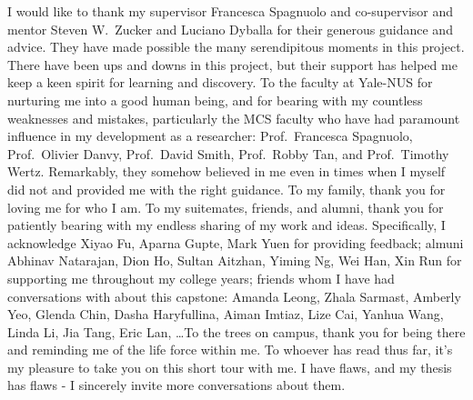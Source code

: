 \documentclass[
hidelinks,
12pt, %
oneside, %
english, %
doublespacing, %
headsepline, %
chapterinoneline, %
]{MastersDoctoralThesis} %
\begin{document}


\begin{acknowledgements}
\addchaptertocentry{\acknowledgementname} 
    I would like to thank my supervisor Francesca Spagnuolo  and co-supervisor and mentor Steven W.~Zucker and Luciano Dyballa for their generous guidance and advice. They have made possible the many serendipitous moments in this project. There have been ups and downs in this project, but their support has helped me keep a keen spirit for learning and discovery. To the faculty at Yale-NUS for nurturing me into a good human being, and for bearing with my countless weaknesses and mistakes, particularly the MCS faculty who have had paramount influence in my development as a researcher: Prof.~Francesca Spagnuolo, Prof.~Olivier Danvy, Prof.~David Smith, Prof.~Robby Tan, and  Prof.~Timothy Wertz. Remarkably, they somehow believed in me even in times when I myself did not and provided me with the right guidance. To my family, thank you for loving me for who I am. To my suitemates, friends, and alumni, thank you for patiently bearing with my endless sharing of my work and ideas. Specifically, I acknowledge Xiyao Fu, Aparna Gupte, Mark Yuen for providing feedback; almuni Abhinav Natarajan, Dion Ho, Sultan Aitzhan, Yiming Ng, Wei Han, Xin Run for supporting me throughout my college years; friends whom I have had conversations with about this capstone: Amanda Leong, Zhala Sarmast, Amberly Yeo, Glenda Chin, Dasha Haryfullina, Aiman Imtiaz, Lize Cai, Yanhua Wang, Linda Li, Jia Tang, Eric Lan, \dots To the trees on campus, thank you for being there and reminding me of the life force within me. To whoever has read thus far, it's my pleasure to take you on this short tour with me. I have flaws, and my thesis has flaws - I sincerely invite more conversations about them. 
\end{acknowledgements}








% 
\end{document}
